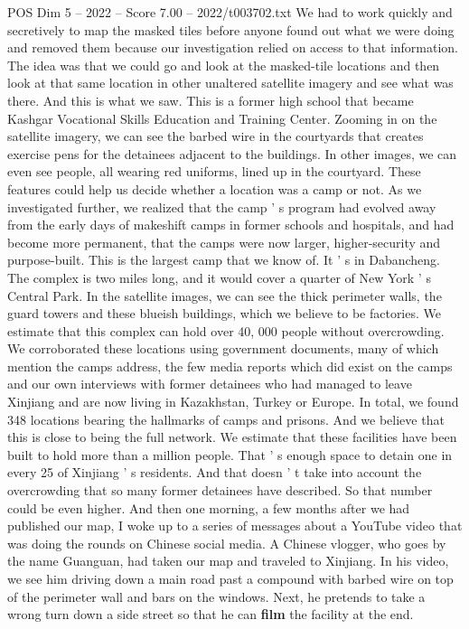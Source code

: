 \begin{textsample}{POS Dim 5 – 2022 – Score 7.00 – 2022/t003702.txt}
We had to work quickly and secretively to map the masked tiles before anyone found out what we were doing and removed them because our investigation relied on access to that information.
The idea was that we could go and look at the masked-tile locations and then look at that same location in other unaltered satellite imagery and see what was there.
And this is what we saw.
This is a former high school that became Kashgar Vocational Skills Education and Training Center.
Zooming in on the satellite imagery, we can see the barbed wire in the courtyards that creates exercise pens for the detainees adjacent to the buildings.
In other images, we can even see people, all wearing red uniforms, lined up in the courtyard.
These features could help us decide whether a location was a camp or not.
As we investigated further, we realized that the camp ' s program had evolved away from the early days of makeshift camps in former schools and hospitals, and had become more permanent, that the camps were now larger, higher-security and purpose-built.
This is the largest camp that we know of.
It ' s in Dabancheng.
The complex is two miles long, and it would cover a quarter of New York ' s Central Park.
In the satellite images, we can see the thick perimeter walls, the guard towers and these blueish buildings, which we believe to be factories.
We estimate that this complex can hold over 40, 000 people without overcrowding.
We corroborated these locations using government documents, many of which mention the camps address, the few media reports which did exist on the camps and our own interviews with former detainees who had managed to leave Xinjiang and are now living in Kazakhstan, Turkey or Europe.
In total, we found 348 locations bearing the hallmarks of camps and prisons.
And we believe that this is close to being the full network.
We estimate that these facilities have been built to hold more than a million people.
That ' s enough space to detain one in every 25 of Xinjiang ' s residents.
And that doesn ' t take into account the overcrowding that so many former detainees have described.
So that number could be even higher.
And then one morning, a few months after we had published our map, I woke up to a series of messages about a YouTube video that was doing the rounds on Chinese social media.
A Chinese vlogger, who goes by the name Guanguan, had taken our map and traveled to Xinjiang.
In his video, we see him driving down a main road past a compound with barbed wire on top of the perimeter wall and bars on the windows.
Next, he pretends to take a wrong turn down a side street so that he can \textbf{film} the facility at the end.

\end{textsample}
